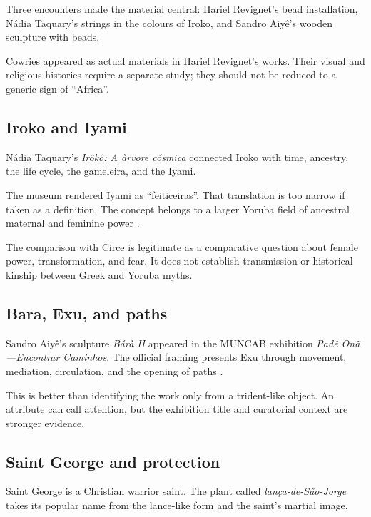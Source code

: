 Three encounters made the material central:
Hariel Revignet's bead installation,
N\'adia Taquary's strings in the colours of
Iroko, and Sandro Aiy\^e's wooden sculpture
with beads.

Cowries appeared as actual materials in
Hariel Revignet's works.  Their visual and
religious histories require a separate
study; they should not be reduced to a
generic sign of ``Africa''.

\subsection{Iroko and Iyami}
\label{religion-section-iroko-iyami}

N\'adia Taquary's
\emph{Ir\^ok\^o: A \`arvore c\'osmica}
connected Iroko with time, ancestry, the
life cycle, the gameleira, and the Iyami.

The museum rendered Iyami as
``feiticeiras''.  That translation is too
narrow if taken as a definition.  The
concept belongs to a larger Yoruba field of
ancestral maternal and feminine power
\cite{santos2008iyami}.

The comparison with Circe is legitimate as
a comparative question about female power,
transformation, and fear.  It does not
establish transmission or historical
kinship between Greek and Yoruba myths.

\subsection{Bara, Exu, and paths}
\label{religion-section-bara-exu-paths}

Sandro Aiy\^e's sculpture
\emph{B\'ar\`a II} appeared in the MUNCAB
exhibition
\emph{Pad\^e On\~a---Encontrar Caminhos}.
The official framing presents Exu through
movement, mediation, circulation, and the
opening of paths
\cite{muncab2026padeona}.

This is better than identifying the work
only from a trident-like object.  An
attribute can call attention, but the
exhibition title and curatorial context are
stronger evidence.

\subsection{Saint George and protection}
\label{religion-section-saint-george}

Saint George is a Christian warrior saint.
The plant called
\emph{lan\c{c}a-de-S\~ao-Jorge} takes its
popular name from the lance-like form and
the saint's martial image.

